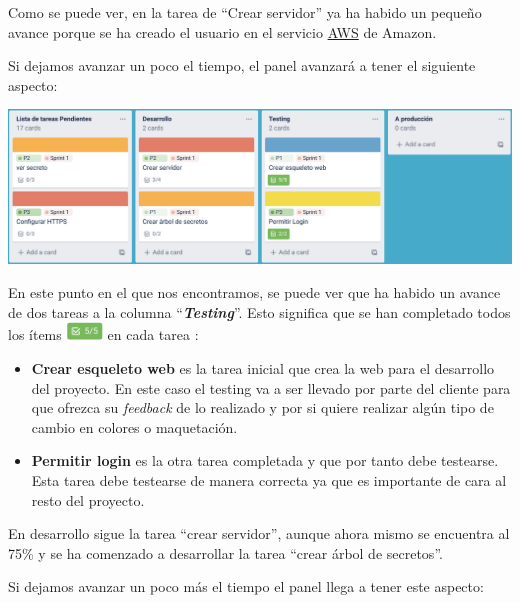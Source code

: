 \documentclass{\ClassPath/viu-tfm-template}
\begin{document}
Como se puede ver, en la tarea de “Crear servidor” ya ha habido un pequeño avance porque se ha creado el usuario en el servicio \href{https://aws.amazon.com/es/}{AWS} de Amazon.

Si dejamos avanzar un poco el tiempo, el panel avanzará a tener el siguiente aspecto:

\begin{center}
    \includegraphics[width=\linewidth]{img/board3.png}
\end{center}

En este punto en el que nos encontramos, se puede ver que ha habido un avance de dos tareas a la columna “\textit{\textbf{Testing}}”. Esto significa que se han completado todos los ítems \includegraphics[height=1.3em]{img/items.png} en cada tarea :
\begin{itemize}
    \item \textbf{Crear esqueleto web} es la tarea inicial que crea la web para el desarrollo del proyecto. En este caso el testing va a ser llevado por parte del cliente para que ofrezca su \textit{feedback} de lo realizado y por si quiere realizar algún tipo de cambio en colores o maquetación.

    \item \textbf{Permitir login} es la otra tarea completada y que por tanto debe testearse. Esta tarea debe testearse de manera correcta ya que es importante de cara al resto del proyecto.
\end{itemize}

En desarrollo sigue la tarea “crear servidor”, aunque ahora mismo se encuentra al 75\% y se ha comenzado a desarrollar la tarea “crear árbol de secretos”.

Si dejamos avanzar un poco más el tiempo el panel llega a tener este aspecto:
\end{document}
